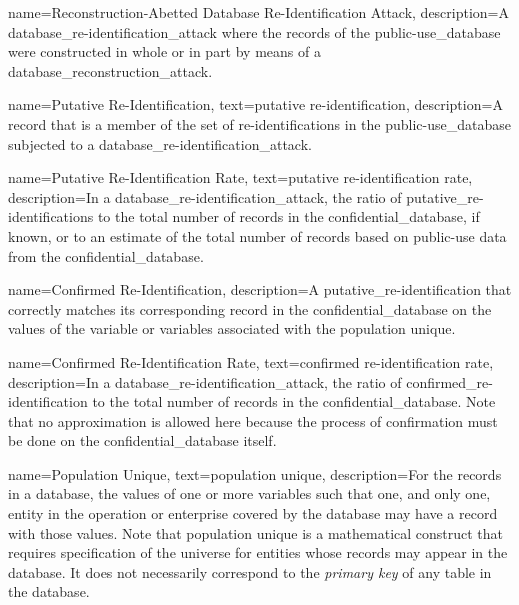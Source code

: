 {
    name=Reconstruction-Abetted Database Re-Identification Attack,
    description={A \gls{database_re-identification_attack} where the \glspl{record} of the \gls{public-use_database} were constructed in whole or in part by means of a \gls{database_reconstruction_attack}.}
}

{
    name=Putative Re-Identification,
    text=putative re-identification,
    description={A \gls{record} that is a member of the set of \glspl{re-identification} in the \gls{public-use_database} subjected to a \gls{database_re-identification_attack}.}
}

{
    name=Putative Re-Identification Rate,
    text=putative re-identification rate,
    description={In a \gls{database_re-identification_attack}, the ratio of \glspl{putative_re-identification} to the total number of \glspl{record} in the \gls{confidential_database}, if known, or to an estimate of the total number of records based on public-use data from the \gls{confidential_database}.}
}

{
    name=Confirmed Re-Identification,
    description={A \gls{putative_re-identification} that correctly matches its corresponding \gls{record} in the \gls{confidential_database} on the values of the variable or variables associated with the population unique.}
}

{
    name=Confirmed Re-Identification Rate,
    text=confirmed re-identification rate,
    description={In a \gls{database_re-identification_attack}, the ratio of \gls{confirmed_re-identification} to the total number of \glspl{record} in the \gls{confidential_database}. Note that no approximation is allowed here because the process of confirmation must be done on the \gls{confidential_database} itself.}
}

{
    name=Population Unique,
    text=population unique,
    description={For the \glspl{record} in a \gls{database}, the values of one or more variables such that one, and only one, entity in the operation or enterprise covered by the database may have a record with those values. Note that population unique is a mathematical construct that requires specification of the universe for entities whose records may appear in the database. It does not necessarily correspond to the \textit{primary key} of any table in the database.}
}

